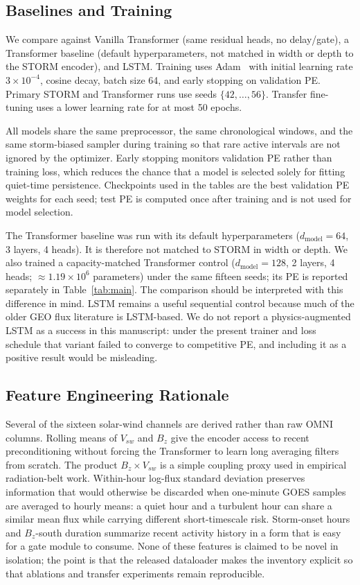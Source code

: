 ﻿\documentclass{ieeeaccess}
\begin{document}
\subsection{Baselines and Training}
We compare against Vanilla Transformer (same residual heads, no delay/gate), a
Transformer baseline (default hyperparameters, not matched in width or depth to the STORM encoder), and LSTM. Training uses Adam~\cite{b29} with initial learning
rate \(3\times10^{-4}\), cosine decay, batch size 64, and early stopping on
validation PE. Primary STORM and Transformer runs use seeds \(\{42,\ldots,56\}\).
Transfer fine-tuning uses a lower learning rate for at most 50 epochs.

All models share the same preprocessor, the same chronological windows, and the
same storm-biased sampler during training so that rare active intervals are not
ignored by the optimizer. Early stopping monitors validation PE rather than
training loss, which reduces the chance that a model is selected solely for
fitting quiet-time persistence. Checkpoints used in the tables are the best
validation PE weights for each seed; test PE is computed once after training and
is not used for model selection.

The Transformer baseline was run with its default hyperparameters 
($d_{\mathrm{model}}=64$, 3 layers, 4 heads). It is therefore not matched 
to STORM in width or depth. We also trained a capacity-matched Transformer
control ($d_{\mathrm{model}}=128$, 2 layers, 4 heads; $\approx1.19\times10^{6}$
parameters) under the same fifteen seeds; its PE is reported separately in
Table~\ref{tab:main}. The comparison should be interpreted with 
this difference in mind. LSTM remains a useful sequential control because much of the older
GEO flux literature is LSTM-based. We do not report a physics-augmented LSTM as a
success in this manuscript: under the present trainer and loss schedule that
variant failed to converge to competitive PE, and including it as a positive
result would be misleading.

\subsection{Feature Engineering Rationale}
Several of the sixteen solar-wind channels are derived rather than raw OMNI
columns. Rolling means of \(V_{sw}\) and \(B_z\) give the encoder access to recent
preconditioning without forcing the Transformer to learn long averaging filters
from scratch. The product \(B_z\times V_{sw}\) is a simple coupling proxy used in
empirical radiation-belt work. Within-hour log-flux standard deviation preserves
information that would otherwise be discarded when one-minute GOES samples are
averaged to hourly means: a quiet hour and a turbulent hour can share a similar
mean flux while carrying different short-timescale risk. Storm-onset hours and
\(B_z\)-south duration summarize recent activity history in a form that is easy for
a gate module to consume. None of these features is claimed to be novel in
isolation; the point is that the released dataloader makes the inventory explicit
so that ablations and transfer experiments remain reproducible.
\end{document}
